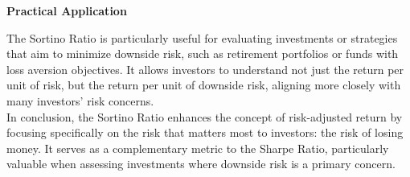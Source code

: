 \documentclass{article}
\begin{document}
\textbf{Practical Application}

The Sortino Ratio is particularly useful for evaluating investments or strategies that aim to minimize downside risk, such as retirement portfolios or funds with loss aversion objectives. It allows investors to understand not just the return per unit of risk, but the return per unit of downside risk, aligning more closely with many investors' risk concerns. \\

In conclusion, the Sortino Ratio enhances the concept of risk-adjusted return by focusing specifically on the risk that matters most to investors: the risk of losing money. It serves as a complementary metric to the Sharpe Ratio, particularly valuable when assessing investments where downside risk is a primary concern.

\clearpage


\end{document}
